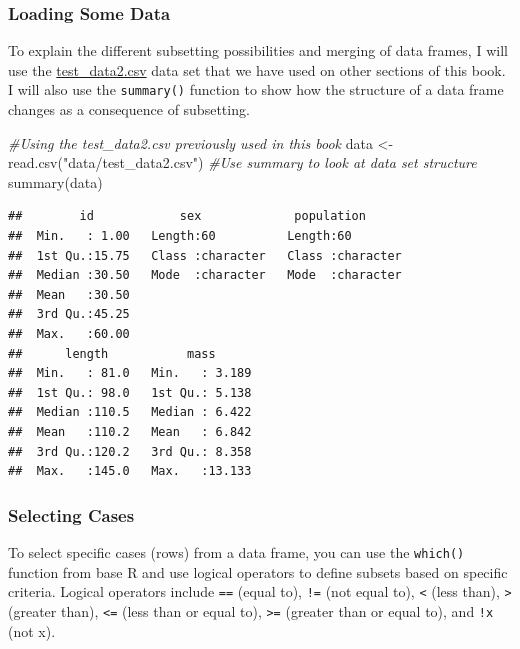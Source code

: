 \documentclass[
]{book}
\newenvironment{Shaded}{\begin{snugshade}}{\end{snugshade}}
\newcommand{\CommentTok}[1]{\textcolor[rgb]{0.56,0.35,0.01}{\textit{#1}}}
\newcommand{\FunctionTok}[1]{\textcolor[rgb]{0.00,0.00,0.00}{#1}}
\newcommand{\NormalTok}[1]{#1}
\newcommand{\OtherTok}[1]{\textcolor[rgb]{0.56,0.35,0.01}{#1}}
\newcommand{\StringTok}[1]{\textcolor[rgb]{0.31,0.60,0.02}{#1}}
\begin{document}
\hypertarget{loading-some-data}{%
\subsubsection*{Loading Some Data}\label{loading-some-data}}

To explain the different subsetting possibilities and merging of data frames, I will use the \href{data/test_data2.csv}{test\_data2.csv} data set that we have used on other sections of this book. I will also use the \texttt{summary()} function to show how the structure of a data frame changes as a consequence of subsetting.

\begin{Shaded}
\begin{Highlighting}[]
\CommentTok{\#Using the test\_data2.csv previously used in this book}
\NormalTok{data }\OtherTok{\textless{}{-}} \FunctionTok{read.csv}\NormalTok{(}\StringTok{"data/test\_data2.csv"}\NormalTok{)}
\CommentTok{\#Use summary to look at data set structure}
\FunctionTok{summary}\NormalTok{(data)}
\end{Highlighting}
\end{Shaded}

\begin{verbatim}
##        id            sex             population       
##  Min.   : 1.00   Length:60          Length:60         
##  1st Qu.:15.75   Class :character   Class :character  
##  Median :30.50   Mode  :character   Mode  :character  
##  Mean   :30.50                                        
##  3rd Qu.:45.25                                        
##  Max.   :60.00                                        
##      length           mass       
##  Min.   : 81.0   Min.   : 3.189  
##  1st Qu.: 98.0   1st Qu.: 5.138  
##  Median :110.5   Median : 6.422  
##  Mean   :110.2   Mean   : 6.842  
##  3rd Qu.:120.2   3rd Qu.: 8.358  
##  Max.   :145.0   Max.   :13.133
\end{verbatim}

\hypertarget{selecting-cases}{%
\subsubsection*{Selecting Cases}\label{selecting-cases}}

To select specific cases (rows) from a data frame, you can use the \texttt{which()} function from base R and use logical operators to define subsets based on specific criteria. Logical operators include \texttt{==} (equal to), \texttt{!=} (not equal to), \texttt{\textless{}} (less than), \texttt{\textgreater{}} (greater than), \texttt{\textless{}=} (less than or equal to), \texttt{\textgreater{}=} (greater than or equal to), and \texttt{!x} (not x).
\end{document}
